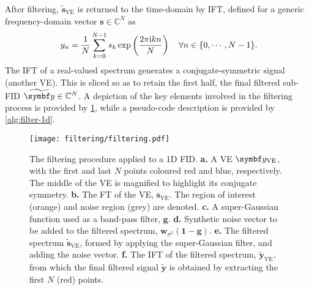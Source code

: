 After filtering, $\widetilde{\symbf{s}}_{\text{VE}}$ is returned to the
time-domain by \ac{IFT}, defined for a generic frequency-domain vector $\symbf{s} \in \mathbb{C}^N$ as
\begin{equation}
    y_n = \frac{1}{N} \sum_{k=0}^{N-1} s_k
        \exp\left(\frac{2 \pi \mathrm{i} k n}{N}\right)
        \quad \forall n \in \lbrace 0, \cdots, N-1 \rbrace.
\end{equation}
The \ac{IFT} of a real-valued spectrum generates a
conjugate-symmetric signal (another \ac{VE}). This is sliced so as to
retain the first half, the final filtered sub-FID $\widetilde{\by} \in
\mathbb{C}^{N}$.
A depiction of the key elements involved in the filtering process is provided
by \cref{fig:filtering}, while a pseudo-code description is provided by
\cref{alg:filter-1d}.
\begin{figure}
     \centering
     \texttt{[image: filtering/filtering.pdf]}
     \caption[
         The filtering procedure applied to a \acs{1D} \acs{FID}.
     ]{
         The filtering procedure applied to a \ac{1D} \ac{FID}.
         \textbf{a.} A \ac{VE} $\by_{\text{VE}}$, with the first and last
         $N$ points coloured red and blue, respectively. The middle of the
         \ac{VE} is magnified to highlight its conjugate symmetry.
         \textbf{b.} The \ac{FT} of the \ac{VE}, $\symbf{s}_{\text{VE}}$.
         The region of interest (orange) and noise region (grey) are denoted.
         \textbf{c.} A super-Gaussian function used as a band-pass filter,
         $\symbf{g}$.
         \textbf{d.} Synthetic noise vector to be added to the filtered
         spectrum, $\symbf{w}_{\sigma^2} (\symbf{1} - \symbf{g})$.
         \textbf{e.} The filtered spectrum $\widetilde{\symbf{s}}_{\text{VE}}$,
         formed by applying the super-Gaussian filter, and adding the noise
         vector.
         \textbf{f.} The \ac{IFT} of the filtered spectrum,
         $\widetilde{\symbf{y}}_{\text{VE}}$, from which the final filtered
         signal $\widetilde{\symbf{y}}$ is obtained by extracting
         the first $N$ (red) points.
     }
     \label{fig:filtering}
\end{figure}

